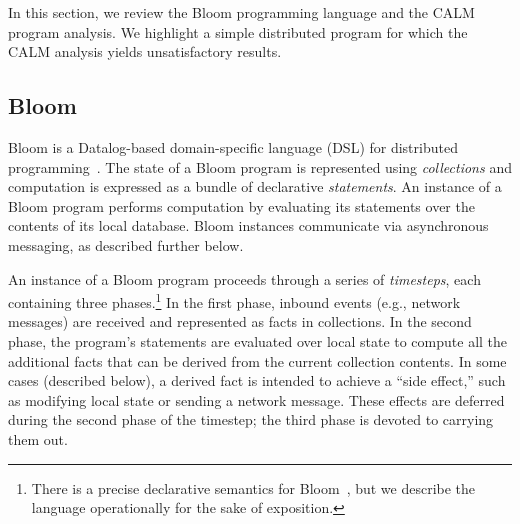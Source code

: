 In this section, we review the Bloom programming language and the CALM program
analysis.    We highlight a simple distributed program for which the CALM analysis
yields unsatisfactory results.  

\subsection{Bloom}
\label{sec:bg-bloom}
Bloom is a Datalog-based domain-specific language (DSL) for distributed
programming~\cite{Alvaro2011,bloom}. The state of a Bloom program is represented
using \emph{collections} and computation is expressed as a bundle of declarative
\emph{statements}.  An instance of a Bloom program performs computation by
evaluating its statements over the contents of its local database. Bloom
instances communicate via asynchronous messaging, as described further below.

An instance of a Bloom program proceeds through a series of \emph{timesteps},
each containing three phases.\footnote{There is a precise declarative semantics
  for Bloom~\cite{dedalus}, but we describe the language operationally for the
  sake of exposition.} In the first phase, inbound events (e.g., network
messages) are received and represented as facts in collections. In the second
phase, the program's statements are evaluated over local state to compute all
the additional facts that can be derived from the current collection
contents. In some cases (described below), a derived fact is intended to achieve
a ``side effect,'' such as modifying local state or sending a network message.
These effects are deferred during the second phase of the timestep; the third
phase is devoted to carrying them out.

